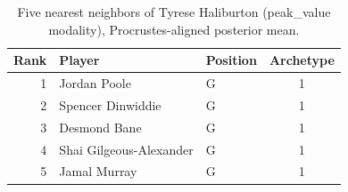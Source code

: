 \begin{table}[htbp]
  \centering\small
  \begin{tabular}{rllc}
    \toprule
    Rank & Player & Position & Archetype \\
    \midrule
    1 & Jordan Poole & G & 1 \\
    2 & Spencer Dinwiddie & G & 1 \\
    3 & Desmond Bane & G & 1 \\
    4 & Shai Gilgeous-Alexander & G & 1 \\
    5 & Jamal Murray & G & 1 \\
    \bottomrule
  \end{tabular}
  \caption{Five nearest neighbors of Tyrese Haliburton (peak_value modality), Procrustes-aligned posterior mean.}
  \label{tab:Tyrese_Haliburton_neighbors_peak_value}
\end{table}

